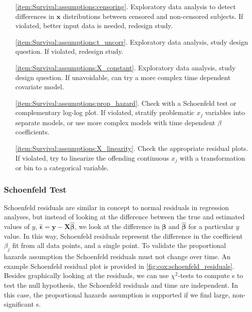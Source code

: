 \begin{itemize}[noitemsep]
\item[\cref{item:Survival:assumptions:censoring}.] Exploratory data analysis to detect differences in $\mathbf{x}$ distributions between censored and non-censored subjects. If violated, better input data is needed, redesign study.

\item[\cref{item:Survival:assumptions:t_uncorr}.] Exploratory data analysis, study design question. If violated, redesign study.

\item[\cref{item:Survival:assumptions:X_constant}.] Exploratory data analysis, study design question. If unavoidable, can try a more complex time dependent covariate model.

\item[\cref{item:Survival:assumptions:prop_hazard}.] Check with a Schoenfeld test or complementary log-log plot. If violated, stratify problematic $x_{j}$ variables into separate models, or use more complex models with time dependent $\beta$ coefficients.

\item[\cref{item:Survival:assumptions:X_linearity}.] Check the appropriate residual plots. If violated, try to linearize the offending continuous $x_{j}$ with a transformation or bin to a categorical variable.
\end{itemize}

\subsubsection{Schoenfeld Test}
\label{additional:Survival:assumptions:schoenfeld}

Schoenfeld residuals are similar in concept to normal residuals in regression analyses,
but instead of looking at the difference between the true and estimated values of $y$,
$\hat{\bm{\epsilon}} = \mathbf{y} - \mathbf{X} \hat{\bm{\beta}}$,
we look at the difference in $\bm{\beta}$ and $\hat{\bm{\beta}}$ for a particular $y$ value.
In this way, Schoenfeld residuals represent the difference in the
coefficient $\beta_{j}$ fit from all data points, and a single point.
To validate the proportional hazards assumption
the Schoenfeld residuals \cite{schoenfeld} must not change over time.
An example Schoenfeld residual plot is provided in
\cref{fig:cox:schoenfeld_residuals}.
Besides graphically looking at the residuals,
we can use $\chi^{2}$-tests to compute {\pvalue}s
to test the null hypothesis, \ie the Schoenfeld residuals and time are independent.
In this case, the proportional hazards assumption is supported
if we find large, non-significant {\pvalue}s.

